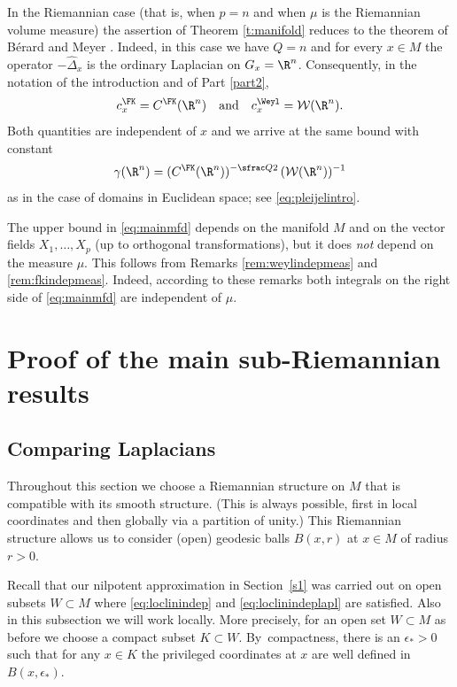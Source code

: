 \begin{remark}
In the Riemannian case (that is, when $p=n$ and when $\mu$ is the Riemannian volume measure) the assertion of Theorem \ref{t:manifold} reduces to the theorem of Bérard and Meyer \cite{BerMe}. Indeed, in this case we have $Q=n$ and for every $x\in M$ the operator $-\widehat\Delta_x$ is the ordinary Laplacian on $G_x=\R^n$. Consequently, in the notation of the introduction and of Part \ref{part2},
\[
c^\FK_x = C^\FK(\R^n)
\quad\text{and}\quad
c_x^\Weyl = \mathcal W(\R^n).
\]
Both quantities are independent of $x$ and we arrive at the same bound with constant
\[
\gamma(\R^n) = (C^\FK(\R^n))^{-\sfrac Q2} \,(\mathcal W(\R^n))^{-1}
\]
as in the case of domains in Euclidean space; see \eqref{eq:pleijelintro}.
\end{remark}

\begin{remark}\label{rem:indepmeas}
The upper bound in \eqref{eq:mainmfd} depends on the manifold $M$ and on the vector fields $X_1,\ldots, X_p$ (up to orthogonal transformations), but it does \emph{not} depend on the measure $\mu$. This follows from Remarks \ref{rem:weylindepmeas} and \ref{rem:fkindepmeas}. Indeed, according to these remarks both integrals on the right side of \eqref{eq:mainmfd} are independent of $\mu$.
\end{remark}

\section{Proof of the main sub-Riemannian results}
\label{sec:mainsubriemproof}

\subsection{Comparing Laplacians}\label{sec:comparinglaplacians}
Throughout this section we choose a Riemannian structure on $M$ that is compatible with its smooth structure. (This is always possible, first in local coordinates and then globally via a partition of unity.) This Riemannian structure allows us to consider (open) geodesic balls $B(x,r)$ at $x\in M$ of radius $r>0$.

Recall that our nilpotent approximation in Section~\ref{s1} was carried out on open subsets $W\subset M$ where \eqref{eq:loclinindep} and \eqref{eq:loclinindeplapl} are satisfied. Also in this subsection we will work locally. More precisely, for an open set $W\subset M$ as before we choose a compact subset $K \subset W$. By~compactness, there is an $\epsilon_*>0$ such that for any $x\in K$ the privileged coordinates at $x$ are well defined in $B(x,\epsilon_*)$.

